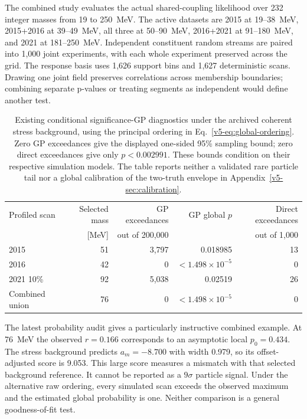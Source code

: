 The combined study evaluates the actual shared-coupling likelihood over
232 integer masses from 19 to 250~MeV. The active datasets are 2015 at
19--38~MeV, 2015+2016 at 39--49~MeV, all three at 50--90~MeV,
2016+2021 at 91--180~MeV, and 2021 at 181--250~MeV. Independent
constituent random streams are paired into 1,000 joint experiments, with
each whole experiment preserved across the grid. The response basis uses
1,626 support bins and 1,627 deterministic scans. Drawing one joint field
preserves correlations across membership boundaries; combining separate
p-values or treating segments as independent would define another test.

\begin{table}[htbp]\centering\small
\begin{tabular}{lrrrr}\toprule
Profiled scan & Selected mass & GP exceedances & GP global $p$ & Direct exceedances\\
 & [MeV] & out of 200,000 & & out of 1,000\\\midrule
2015 & 51 & 3,797 & 0.018985 & 13\\
2016 & 42 & 0 & $<1.498\times10^{-5}$ & 0\\
2021 10\% & 92 & 5,038 & 0.02519 & 26\\
Combined union & 76 & 0 & $<1.498\times10^{-5}$ & 0\\\bottomrule
\end{tabular}
\caption{Existing conditional significance-GP diagnostics under the
archived coherent stress background, using the principal ordering in
Eq.~\ref{v5-eq:global-ordering}. Zero GP exceedances give the displayed
one-sided 95\% sampling bound; zero direct exceedances give only
$p<0.002991$. These bounds condition on their respective simulation models.
The table reports neither a validated rare particle tail nor a global
calibration of the two-truth envelope in Appendix~\ref{v5-sec:calibration}.}
\label{v5-tab:global-diagnostics}
\end{table}

The latest probability audit gives a particularly instructive combined
example. At 76~MeV the observed $r=0.166$ corresponds to an asymptotic local
$p_0=0.434$. The stress background predicts $a_m=-8.700$ with width 0.979,
so its offset-adjusted score is 9.053. This large score measures a
mismatch with that selected background reference. It cannot be reported
as a $9\sigma$ particle signal. Under the alternative raw ordering, every
simulated scan exceeds the observed maximum and the estimated global
probability is one. Neither comparison is a general goodness-of-fit test.

